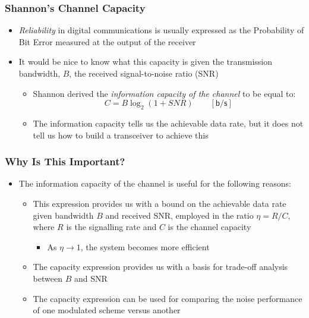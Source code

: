 \documentclass[10pt]{beamer}
\begin{document}
\frame
{
  \frametitle{Shannon's Channel Capacity}

  \begin{itemize}
  \item {\it Reliability} in digital communications is usually expressed as the Probability of Bit Error measured at the output of the receiver
  \item It would be nice to know what this capacity is given the transmission bandwidth, $B$, the received signal-to-noise ratio (SNR)
  \begin{itemize}
  \item Shannon derived the {\it information capacity of the channel} to be equal to:
  \begin{equation}
    C=B\log_{2}(1+SNR)\qquad\mathsf{[b/s]}
  \end{equation}
  \item The information capacity tells us the achievable data rate, but it does not tell us how to build a transceiver to achieve this
  \end{itemize}
  \end{itemize}
}

\frame
{
  \frametitle{Why Is This Important?}

  \begin{itemize}
  \item The information capacity of the channel is useful for the following reasons:
  \begin{itemize}
  \item This expression provides us with a bound on the achievable data rate given bandwidth $B$ and received SNR, employed in the ratio $\eta = R/C$, where $R$ is the signalling rate and $C$ is the channel capacity
  \begin{itemize}
  \item As $\eta\rightarrow{1}$, the system becomes more efficient
  \end{itemize}
  \item The capacity expression provides us with a basis for trade-off analysis between $B$ and SNR
  \item The capacity expression can be used for comparing the noise performance of one modulated scheme versus another
  \end{itemize}
  \end{itemize}
}
\end{document}
